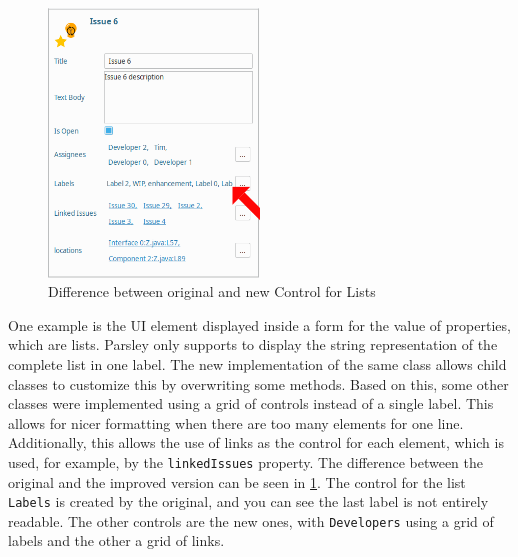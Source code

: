 \begin{figure}[!h]
	\centering
	\includegraphics[width=0.5\textwidth]{graphics/screenshot_improvement_fromControl_arrow.png}
	\caption{Difference between original and new Control for Lists}
	\label{fig:c4:screenshot_improvement_formControl}
\end{figure}
One example is the \gls{UI} element displayed inside a form for the value of properties, which are lists.
Parsley only supports to display the string representation of the complete list in one label.
The new implementation of the same class allows child classes to customize this by overwriting some methods.
Based on this, some other classes were implemented using a grid of controls instead of a single label.
This allows for nicer formatting when there are too many elements for one line.
Additionally, this allows the use of links as the control for each element, which is used, for example, by the \lstinline|linkedIssues| property.
The difference between the original and the improved version can be seen in \cref{fig:c4:screenshot_improvement_formControl}.
The control for the list \lstinline|Labels| is created by the original, and you can see the last label is not entirely readable.
The other controls are the new ones, with \lstinline|Developers| using a grid of labels and the other a grid of links.

